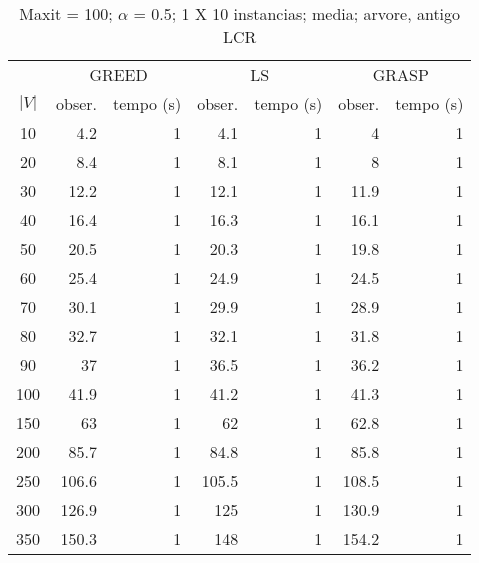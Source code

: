 \documentclass[]{article}
\title{}
\author{}
\begin{document}
\maketitle

\begin{abstract}

\end{abstract}

\section{}

\begin {table}[h]
\centering
\caption{Maxit = 100; $\alpha$ = 0.5; 1 X 10 instancias; media; arvore, antigo LCR}
\begin{small}
	\begin{tabular}{|c|r|r|r|r|r|r|}
		\hline
		& \multicolumn{2}{c|}{GREED} & \multicolumn{2}{c|}{LS} & \multicolumn{2}{c|}{GRASP} \\ 
		\cline{2-7}
		$|V|$   &  obser. & tempo (s)  & obser. & tempo (s) & obser. & tempo (s)\\ 
		\hline
		10 & 4.2 & 1 & 4.1 & 1 & 4 & 1 \\ 
		20 & 8.4 & 1 & 8.1 & 1 & 8 & 1 \\ 
		30 & 12.2 & 1 & 12.1 & 1 & 11.9 & 1 \\ 
		40 & 16.4 & 1 & 16.3 & 1 & 16.1 & 1 \\ 
		50 & 20.5 & 1 & 20.3 & 1 & 19.8 & 1 \\ 
		60 & 25.4 & 1 & 24.9 & 1 & 24.5 & 1 \\ 
		70 & 30.1 & 1 & 29.9 & 1 & 28.9 & 1 \\ 
		80 & 32.7 & 1 & 32.1 & 1 & 31.8 & 1 \\ 
		90 & 37 & 1 & 36.5 & 1 & 36.2 & 1 \\ 
		100 & 41.9 & 1 & 41.2 & 1 & 41.3 & 1 \\ 
		150 & 63 & 1 & 62 & 1 & 62.8 & 1 \\ 
		200 & 85.7 & 1 & 84.8 & 1 & 85.8 & 1 \\ 
		250 & 106.6 & 1 & 105.5 & 1 & 108.5 & 1 \\ 
		300 & 126.9 & 1 & 125 & 1 & 130.9 & 1 \\ 
		350 & 150.3 & 1 & 148 & 1 & 154.2 & 1 \\ 
		\hline
	\end{tabular} \label{}
\end{small}
\end{table}
\end{document}
